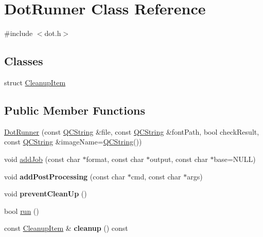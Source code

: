 \hypertarget{class_dot_runner}{}\section{Dot\+Runner Class Reference}
\label{class_dot_runner}


{\ttfamily \#include $<$dot.\+h$>$}

\subsection*{Classes}
\begin{DoxyCompactItemize}
\item 
struct \mbox{\hyperlink{struct_dot_runner_1_1_cleanup_item}{Cleanup\+Item}}
\end{DoxyCompactItemize}
\subsection*{Public Member Functions}
\begin{DoxyCompactItemize}
\item 
\mbox{\hyperlink{class_dot_runner_a0139716432105faf63356af65f993559}{Dot\+Runner}} (const \mbox{\hyperlink{class_q_c_string}{Q\+C\+String}} \&file, const \mbox{\hyperlink{class_q_c_string}{Q\+C\+String}} \&font\+Path, bool check\+Result, const \mbox{\hyperlink{class_q_c_string}{Q\+C\+String}} \&image\+Name=\mbox{\hyperlink{class_q_c_string}{Q\+C\+String}}())
\item 
void \mbox{\hyperlink{class_dot_runner_a52736a54f8ee8d52941cb4b1edaea394}{add\+Job}} (const char $\ast$format, const char $\ast$output, const char $\ast$base=N\+U\+LL)
\item 
\mbox{\label{class_dot_runner_a84e3b1076cb4529baad7d694c35dadba}} 
void {\bfseries add\+Post\+Processing} (const char $\ast$cmd, const char $\ast$args)
\item 
\mbox{\label{class_dot_runner_a2c9b6af873f263c04913504d0f420274}} 
void {\bfseries prevent\+Clean\+Up} ()
\item 
bool \mbox{\hyperlink{class_dot_runner_ac1afaee16ddd8bf0bc6b18aaed6b44fd}{run}} ()
\item 
\mbox{\label{class_dot_runner_aa5a3e3a1ee6d3ffe0b6c7349a4ef24e4}} 
const \mbox{\hyperlink{struct_dot_runner_1_1_cleanup_item}{Cleanup\+Item}} \& {\bfseries cleanup} () const
\end{DoxyCompactItemize}


